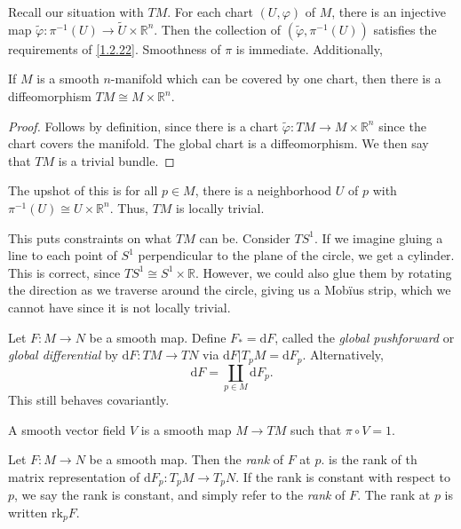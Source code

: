 Recall our situation with $TM$. For each chart $(U,\varphi )$ of $M$, there is an injective map $\widetilde{\varphi } : \pi ^{-1} (U) \to \widetilde{U}\times \mathbb{R}^n $. Then the collection of $(\widetilde{\varphi },\pi ^{-1} (U))$ satisfies the requirements of \cref{1.2.22}. Smoothness of $\pi $ is immediate. Additionally,

\begin{proposition}\label{1.2.23}
	If $M$ is a smooth $n$-manifold which can be covered by one chart, then there is a diffeomorphism $TM\cong M\times \mathbb{R} ^n$.
\end{proposition}
\begin{proof}
	Follows by definition, since there is a chart $\widetilde{\varphi } : TM \to M\times \mathbb{R} ^n$ since the chart covers the manifold. The global chart is a diffeomorphism. We then say that $TM$ is a trivial bundle.
\end{proof}

The upshot of this is for all $p\in M$, there is a neighborhood $U$ of $p$ with $\pi ^{-1} (U) \cong U\times \mathbb{R} ^n$. Thus, $TM$ is locally trivial.

This puts constraints on what $TM$ can be. Consider $TS^1$. If we imagine gluing a line to each point of $S^1$ perpendicular to the plane of the circle, we get a cylinder. This is correct, since $TS^1 \cong S^1\times \mathbb{R} $. However, we could also glue them by rotating the direction as we traverse around the circle, giving us a Mob\"ius strip, which we cannot have since it is not locally trivial.

\begin{definition}\label{1.2.24}
	Let $F : M \to N$ be a smooth map. Define $F_* = \mathrm{d} F$, called the \emph{global pushforward} or \emph{global differential} by $\mathrm{d} F : TM \to TN$ via $\mathrm{d} F|T_pM = \mathrm{d} F_p$. Alternatively,
	\[
		\mathrm{d} F = \coprod_{p\in M} \mathrm{d} F_p
	.\]
	This still behaves covariantly.
\end{definition}

\begin{definition}\label{1.2.25}
	A smooth vector field $V$ is a smooth map $M\to TM$ such that $\pi \circ V=1$.
\end{definition}

\begin{definition}\label{1.2.26}
	Let $F : M \to N$ be a smooth map. Then the \emph{rank} of $F$ at $p$. is the rank of th matrix representation of $\mathrm{d}F_p : T_pM \to T_pN$. If the rank is constant with respect to $p$, we say the rank is constant, and simply refer to the \emph{rank} of $F$. The rank at $p$ is written $\mathrm{rk}_pF$.
\end{definition}

